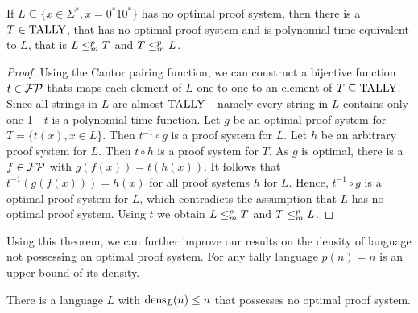   \begin{theorem}
    If \(L \subseteq \{ x \in \Sigma^*, x = 0^*10^* \}\) has no optimal proof system, then there is a \(T \in \text{TALLY}\), that has no optimal proof system and is polynomial time equivalent to \(L\), that is \(L \leq_{m}^{p} T\) and \(T \leq_{m}^{p} L\).
  \end{theorem}

  \begin{proof}
    Using the Cantor pairing function, we can construct a bijective function \(t \in \mathcal{FP}\) thats maps each element of \(L\) one-to-one to an element of \(T \subseteq \text{TALLY}\). Since all strings in \(L\) are almost \(\text{TALLY}\)---namely every string in \(L\) contains only one 1---\(t\) is a polynomial time function. Let \(g\) be an optimal proof system for \(T = \{ t(x), x \in L \}\). Then \(t^{-1} \circ g\) is a proof system for \(L\). Let \(h\) be an arbitrary proof system for \(L\). Then \(t \circ h\) is a proof system for \(T\). As \(g\) is optimal, there is a \(f \in \mathcal{FP}\) with \(g(f(x)) = t(h(x))\). It follows that \(t^{-1}(g(f(x))) = h(x)\) for all proof systems \(h\) for \(L\). Hence, \(t^{-1} \circ g\) is a optimal proof system for \(L\), which contradicts the assumption that \(L\) has no optimal proof system. Using \(t\) we obtain \(L \leq_{m}^{p} T\) and \(T \leq_{m}^{p} L\).
  \end{proof}
  
  Using this theorem, we can further improve our results on the density of language not possessing an optimal proof system. For any tally language \(p(n) = n\) is an upper bound of its density.

  \begin{corollary}
    There is a language \(L\) with \(\operatorname{dens}_L(n) \leq n\) that possesses no optimal proof system.
  \end{corollary}

  